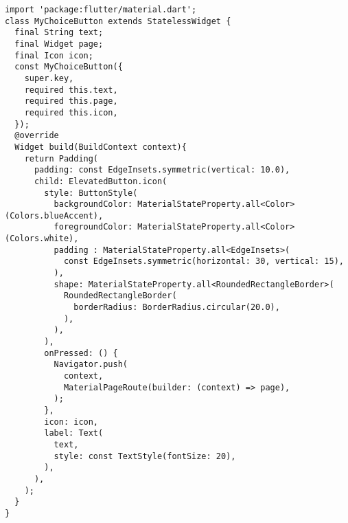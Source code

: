 \begin{lstlisting}[style=pythonstyle,caption={Codice del my\_choice\_button.dart}, label={lst:choicebutton}]
import 'package:flutter/material.dart';
class MyChoiceButton extends StatelessWidget {
  final String text;
  final Widget page;
  final Icon icon;
  const MyChoiceButton({
    super.key,
    required this.text,
    required this.page,
    required this.icon,
  });
  @override
  Widget build(BuildContext context){
    return Padding(
      padding: const EdgeInsets.symmetric(vertical: 10.0),
      child: ElevatedButton.icon(
        style: ButtonStyle(
          backgroundColor: MaterialStateProperty.all<Color>(Colors.blueAccent),
          foregroundColor: MaterialStateProperty.all<Color>(Colors.white),
          padding : MaterialStateProperty.all<EdgeInsets>(
            const EdgeInsets.symmetric(horizontal: 30, vertical: 15),  
          ),
          shape: MaterialStateProperty.all<RoundedRectangleBorder>(
            RoundedRectangleBorder(
              borderRadius: BorderRadius.circular(20.0),
            ),
          ),
        ),
        onPressed: () {
          Navigator.push(
            context, 
            MaterialPageRoute(builder: (context) => page),
          );
        }, 
        icon: icon, 
        label: Text(
          text,
          style: const TextStyle(fontSize: 20),
        ),
      ),
    );
  }
}
\end{lstlisting}
